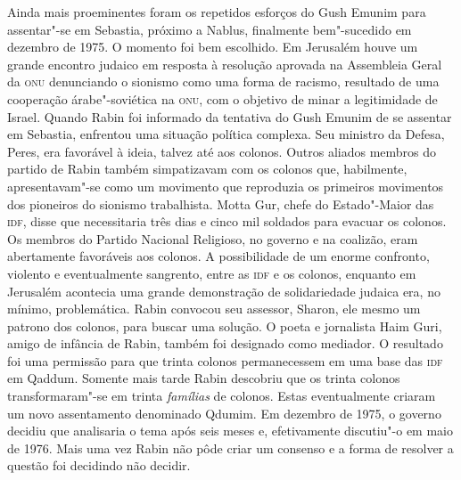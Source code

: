 Ainda mais proeminentes foram os repetidos esforços do Gush Emunim para
assentar"-se em Sebastia, próximo a Nablus, finalmente bem"-sucedido em
dezembro de 1975. O momento foi bem escolhido. Em Jerusalém houve um
grande encontro judaico em resposta à resolução aprovada na Assembleia
Geral da \textsc{onu} denunciando o sionismo como uma forma de racismo, resultado
de uma cooperação árabe"-soviética na \textsc{onu}, com o objetivo de minar a
legitimidade de Israel. Quando Rabin foi informado da tentativa do Gush
Emunim de se assentar em Sebastia, enfrentou uma situação política
complexa. Seu ministro da Defesa, Peres, era favorável à ideia, talvez
até aos colonos. Outros aliados membros do partido de Rabin também
simpatizavam com os colonos que, habilmente, apresentavam"-se como um
movimento que reproduzia os primeiros movimentos dos pioneiros do
sionismo trabalhista. Motta Gur, chefe do Estado"-Maior das \textsc{idf}, disse
que necessitaria três dias e cinco mil soldados para evacuar os colonos.
Os membros do Partido Nacional Religioso, no governo e na coalizão, eram
abertamente favoráveis aos colonos. A possibilidade de um enorme
confronto, violento e eventualmente sangrento, entre as \textsc{idf} e os
colonos, enquanto em Jerusalém acontecia uma grande demonstração de
solidariedade judaica era, no mínimo, problemática. Rabin convocou seu
assessor, Sharon, ele mesmo um patrono dos colonos, para buscar uma
solução. O poeta e jornalista Haim Guri, amigo de infância de Rabin,
também foi designado como mediador. O resultado foi uma
permissão para que trinta colonos permanecessem em uma base das \textsc{idf} em
Qaddum. Somente mais tarde Rabin descobriu que os trinta colonos
transformaram"-se em trinta \textit{famílias} de colonos. Estas
eventualmente criaram um novo assentamento denominado Qdumim. Em
dezembro de 1975, o governo decidiu que analisaria o tema após seis meses
e, efetivamente discutiu"-o em maio de 1976. Mais uma vez Rabin não pôde
criar um consenso e a forma de resolver a questão foi decidindo não
decidir.


